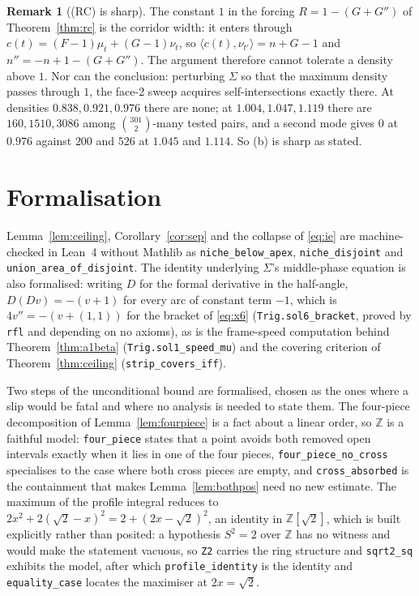 \documentclass[11pt]{article}
\theoremstyle{definition}
\newtheorem{remark}[theorem]{Remark}
\newcommand{\Z}{\mathbb{Z}}
\newcommand{\Sig}{\Sigma}
\begin{document}
\begin{remark}[(RC) is sharp]\label{rem:sharp}
The constant $1$ in the forcing $R=1-(G+G'')$ of Theorem~\ref{thm:rc} is the corridor
width: it enters through $c(t)=(F-1)\mu_t+(G-1)\nu_t$, so
$\langle c(t),\nu_{t'}\rangle=n+G-1$ and $n''=-n+1-(G+G'')$. The argument therefore cannot
tolerate a density above $1$. Nor can the conclusion: perturbing $\Sig$ so that the maximum
density passes through $1$, the face-2 sweep acquires self-intersections exactly there. At
densities $0.838,0.921,0.976$ there are none; at $1.004,1.047,1.119$ there are
$160,1510,3086$ among $\binom{301}{2}$-many tested pairs, and a second mode gives $0$ at
$0.976$ against $200$ and $526$ at $1.045$ and $1.114$. So (b) is sharp as stated.
\end{remark}

\section{Formalisation}

Lemma~\ref{lem:ceiling}, Corollary~\ref{cor:sep} and the collapse of
\eqref{eq:ie} are machine-checked in Lean~4 without Mathlib as
\verb|niche_below_apex|, \verb|niche_disjoint| and
\verb|union_area_of_disjoint|. The identity underlying $\Sigma$'s middle-phase
equation is also formalised: writing $D$ for the formal derivative in the
half-angle, $D(Dv)=-(v+1)$ for every arc of constant term $-1$, which is
$4v''=-(v+(1,1))$ for the bracket of \eqref{eq:x6}
(\verb|Trig.sol6_bracket|, proved by \verb|rfl| and depending on no axioms), as is
the frame-speed computation behind Theorem~\ref{thm:a1beta}
(\verb|Trig.sol1_speed_mu|) and the covering criterion of
Theorem~\ref{thm:ceiling} (\verb|strip_covers_iff|).

Two steps of the unconditional bound are formalised, chosen as the ones where a slip
would be fatal and where no analysis is needed to state them. The four-piece
decomposition of Lemma~\ref{lem:fourpiece} is a fact about a linear order, so $\Z$ is a
faithful model: \verb|four_piece| states that a point avoids both removed open intervals
exactly when it lies in one of the four pieces, \verb|four_piece_no_cross| specialises to
the case where both cross pieces are empty, and \verb|cross_absorbed| is the containment
that makes Lemma~\ref{lem:bothpos} need no new estimate. The maximum of the profile
integral reduces to $2x^2+2(\sqrt2-x)^2=2+(2x-\sqrt2)^2$, an identity in
$\Z[\sqrt2]$, which is built explicitly rather than posited: a hypothesis $S^2=2$ over
$\Z$ has no witness and would make the statement vacuous, so \verb|Z2| carries the ring
structure and \verb|sqrt2_sq| exhibits the model, after which \verb|profile_identity| is
the identity and \verb|equality_case| locates the maximiser at $2x=\sqrt2$.
\end{document}
